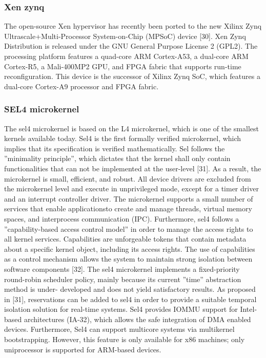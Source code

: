 \subsubsection{Xen zynq}
The open-source Xen hypervisor has recently been ported to the new
Xilinx Zynq Ultrascale+Multi-Processor System-on-Chip (MPSoC) device
[30]. Xen Zynq Distribution is released under the GNU General Purpose
License 2 (GPL2). The processing platform features a quad-core ARM
Cortex-A53, a dual-core ARM Cortex-R5, a Mali-400MP2 GPU, and FPGA
fabric that supports run-time reconfiguration. This device is the successor of
Xilinx Zynq SoC, which features a dual-core Cortex-A9 processor and FPGA
fabric.

\subsubsection{SEL4 microkernel}
The sel4 microkernel is based on the L4 microkernel, which is one of the
smallest kernels available today. Sel4 is the first formally verified microkernel,
which implies that its specification is verified mathematically. Sel follows
the ”minimality principle”, which dictates that the kernel shall only contain
functionalities that can not be implemented at the user-level [31]. As a result,
the microkernel is small, efficient, and robust. All device drivers are excluded
from the microkernel level and execute in unprivileged mode, except for a
timer driver and an interrupt controller driver.
The microkernel supports a small number of services that enable applicationsto create and manage threads, virtual memory spaces, and interprocess
communication (IPC). Furthermore, sel4 follows a ”capability-based access
control model” in order to manage the access rights to all kernel services.
Capabilities are unforgeable tokens that contain metadata about a specific
kernel object, including its access rights. The use of capabilities as a control
mechanism allows the system to maintain strong isolation between software
components [32].
The sel4 microkernel implements a fixed-priority round-robin scheduler
policy, mainly because its current ”time” abstraction method is under-
developed and does not yield satisfactory results. As proposed in [31],
reservations can be added to sel4 in order to provide a suitable temporal
isolation solution for real-time systems.
Sel4 provides IOMMU support for Intel-based architectures (IA-32),
which allows the safe integration of DMA enabled devices. Furthermore,
Sel4 can support multicore systems via multikernel bootstrapping. However,
this feature is only available for x86 machines; only uniprocessor is supported
for ARM-based devices.


